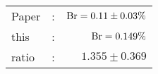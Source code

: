       \begin{tabular}{lcr}
          Paper &:& $\mathrm{Br}  = 0.11\pm 0.03\%$ \\
          this      &:& $\mathrm{Br}  = 0.149\%$ \\
		  ratio   &:& $1.355\pm 0.369$ \\
      \end{tabular}
